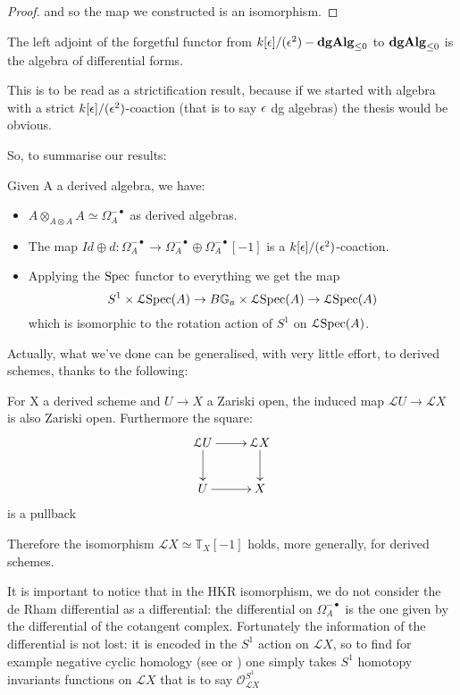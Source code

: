 \begin{refsection}
\begin{proof}
and so the map we constructed is an isomorphism.
\end{proof}

\begin{corollary}
The left adjoint of the forgetful functor from $k[\epsilon]/(\epsilon^2)-\mathbf{dgAlg}_{\leq 0}$ to $\mathbf{dgAlg}_{\leq 0}$ is the algebra of differential forms.
\end{corollary}

\begin{remark}
This is to be read as a strictification result, because if we started with algebra with a strict $k[\epsilon]/(\epsilon^2)$-coaction (that is to say $\epsilon$ dg algebras) the thesis would be
obvious.
\end{remark}

So, to summarise our results:

\begin{theorem} Given A a derived algebra, we have:
\begin{itemize}
 \item $A\otimes_{A\otimes A}A\simeq \Omega_A^{-\bullet}$ as derived algebras.
 \item The map $Id\oplus d:\Omega_A^{-\bullet}\to\Omega_A^{-\bullet}\oplus \Omega_A^{-\bullet}[-1]$ is a
 $k[\epsilon]/(\epsilon^2)$-coaction.
\item Applying the $\mathrm{Spec}$ functor to everything we get the map $$S^1\times \mathcal{L}\mathrm{Spec}(A)\to B\mathbb{G}_a\times \mathcal{L} \mathrm{Spec}(A)\to\mathcal{L}\mathrm{Spec}(A)$$ which is isomorphic to
the rotation action of $S^1$ on $\mathcal{L} \mathrm{Spec}(A)$.
\end{itemize}
\end{theorem}

Actually, what we've done can be generalised, with very little effort, to derived schemes, thanks to the following:

\begin{proposition} \cite{Be-Na}
For X a derived scheme and $U\to X$ a Zariski open, the induced map $\mathcal{L} U\to \mathcal{L} X$
is also Zariski open. Furthermore the square:
\begin{displaymath}
\xymatrix{
\mathcal{L} U \ar[r] \ar[d] &  \mathcal{L} X \ar[d]\\
 U \ar[r] & X\\
}
\end{displaymath}
is a pullback
\end{proposition}

Therefore the isomorphism $\mathcal{L} X\simeq \mathbb{T}_X[-1]$ holds, more generally, for derived schemes.

\begin{remark}
It is important to notice that in the HKR isomorphism, we do not consider the de Rham differential as a differential: the differential on $\Omega_A^{-\bullet}$ is the one
given by the differential of the cotangent complex. Fortunately the information of the differential is not lost: it is encoded in the $S^1$ action on $\mathcal{L} X$, so to
find for example negative cyclic homology (see \cite{connes} or \cite{shiftedsymplectic}) one simply takes $S^1$ homotopy invariants functions on $\mathcal{L} X$ that is to say
$\mathcal{O}_{\mathcal{L} X}^{S^1}$
\end{remark}

\nocite{to3, ToVedeRham}
\printbibliography[heading = local]

\end{refsection}
